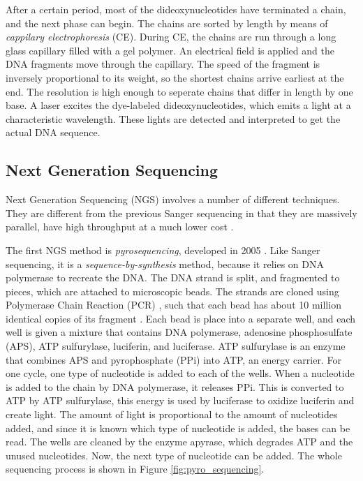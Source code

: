 \documentclass[../main/thesis.tex]{subfiles}
\begin{document}
After a certain period, most of the dideoxynucleotides have terminated a chain, and the next phase can begin.
The chains are sorted by length by means of \textit{cappilary electrophoresis} (CE).
During CE, the chains are run through a long glass capillary filled with a gel polymer.
An electrical field is applied and the DNA fragments move through the capillary.
The speed of the fragment is inversely proportional to its weight, so the shortest chains arrive earliest at the end.
The resolution is high enough to seperate chains that differ in length by one base.
A laser excites the dye-labeled dideoxynucleotides, which emits a light at a characteristic wavelength.
These lights are detected and interpreted to get the actual DNA sequence.


\subsection{Next Generation Sequencing}
Next Generation Sequencing (NGS) involves a number of different techniques.
They are different from the previous Sanger sequencing in that they are massively parallel, have high throughput at a much lower cost \cite{ngs_history}.


The first NGS method is \textit{pyrosequencing}, developed in 2005 \cite{history_sequencing}.
Like Sanger sequencing, it is a \textit{sequence-by-synthesis} method, because it relies on DNA polymerase to recreate the DNA.
The DNA strand is split, and fragmented to pieces, which are attached to microscopic beads.
The strands are cloned using Polymerase Chain Reaction (PCR) \cite{dna_cloning}\cite{ngs_sequencing_atdbio}, such that each bead has about 10 million identical copies of its fragment \cite{pyro_sequencing2}.
Each bead is place into a separate well, and each well is given a mixture that contains DNA polymerase, adenosine phosphosulfate (APS), ATP sulfurylase, luciferin, and luciferase.
ATP sulfurylase is an enzyme that combines APS and pyrophosphate (PPi) into ATP, an energy carrier.
For one cycle, one type of nucleotide is added to each of the wells.
When a nucleotide is added to the chain by DNA polymerase, it releases PPi.
This is converted to ATP by ATP sulfurylase, this energy is used by luciferase to oxidize luciferin and create light.
The amount of light is proportional to the amount of nucleotides added, and since it is known which type of nucleotide is added, the bases can be read.
The wells are cleaned by the enzyme apyrase, which degrades ATP and the unused nucleotides.
Now, the next type of nucleotide can be added.
The whole sequencing process is shown in Figure \ref{fig:pyro_sequencing}.
\end{document}
